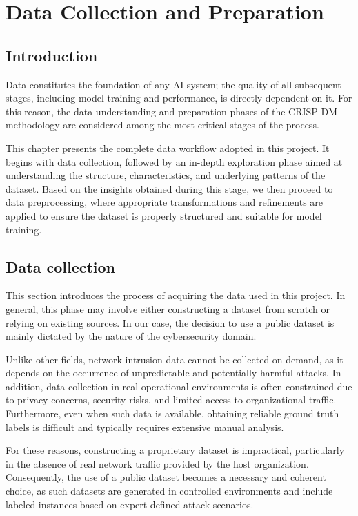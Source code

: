 \chapter{Data Collection and Preparation}

\section{Introduction}
Data constitutes the foundation of any AI system; the quality of all subsequent stages, including model training and performance, is directly dependent on it. For this reason, the data understanding and preparation phases of the CRISP-DM methodology are considered among the most critical stages of the process.

This chapter presents the complete data workflow adopted in this project. It begins with data collection, followed by an in-depth exploration phase aimed at understanding the structure, characteristics, and underlying patterns of the dataset. Based on the insights obtained during this stage, we then proceed to data preprocessing, where appropriate transformations and refinements are applied to ensure the dataset is properly structured and suitable for model training.

\section{Data collection}

This section introduces the process of acquiring the data used in this project. In general, this phase may involve either constructing a dataset from scratch or relying on existing sources. In our case, the decision to use a public dataset is mainly dictated by the nature of the cybersecurity domain.


Unlike other fields, network intrusion data cannot be collected on demand, as it depends on the occurrence of unpredictable and potentially harmful attacks. In addition, data collection in real operational environments is often constrained due to privacy concerns, security risks, and limited access to organizational traffic. Furthermore, even when such data is available, obtaining reliable ground truth labels is difficult and typically requires extensive manual analysis.

For these reasons, constructing a proprietary dataset is impractical, particularly in the absence of real network traffic provided by the host organization. Consequently, the use of a public dataset becomes a necessary and coherent choice, as such datasets are generated in controlled environments and include labeled instances based on expert-defined attack scenarios.

